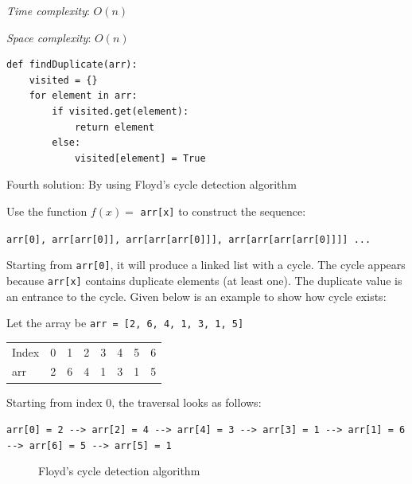 \documentclass[a4paper,11pt]{book}
\begin{document}
\noindent \textit{Time complexity}: $O(n)$

\noindent \textit{Space complexity}: $O(n)$

\begin{lstlisting}
def findDuplicate(arr):
    visited = {}
    for element in arr:
        if visited.get(element):
            return element
        else:
            visited[element] = True
\end{lstlisting}

\noindent Fourth solution: By using Floyd's cycle detection algorithm

\noindent Use the function $f(x) = $ \lstinline{arr[x]} to construct the sequence:
\vspace{3mm}

\lstinline{arr[0], arr[arr[0]], arr[arr[arr[0]]], arr[arr[arr[arr[0]]]] ... }
\vspace{3mm}

\noindent Starting from \lstinline{arr[0]}, it will produce a linked list with a cycle. The cycle appears because \lstinline{arr[x]} contains duplicate elements (at least one). The duplicate value is an entrance to the cycle. Given below is an example to show how cycle exists: 

\noindent Let the array be \lstinline{arr = [2, 6, 4, 1, 3, 1, 5]}

\begin{table}[H]
\begin{tabular}{llllllll}
Index & 0 & 1 & 2 & 3 & 4 & 5 & 6 \\
arr   & 2 & 6 & 4 & 1 & 3 & 1 & 5
\end{tabular}
\end{table}

\noindent Starting from index 0, the traversal looks as follows:
\vspace{3mm}

\noindent \lstinline{arr[0] = 2 --> arr[2] = 4 --> arr[4] = 3 --> arr[3] = 1 --> arr[1] = 6 --> arr[6] = 5 --> arr[5] = 1}
\vspace{5mm}

\begin{figure}[ht]
\begin{center}
\end{center}
\caption{Floyd's cycle detection algorithm}
\end{figure}
\vspace{5mm}
\end{document}
